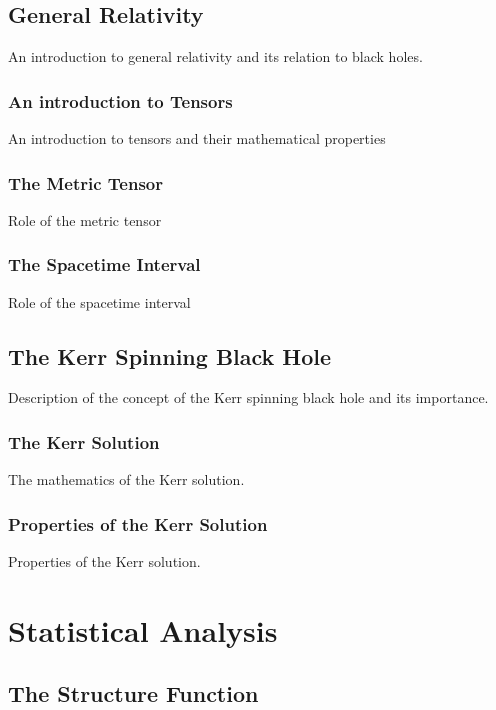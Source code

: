 \documentclass[12pt, oneside]{smuthesis}
\begin{document}
\section{\sc General Relativity}

An introduction to general relativity and its relation to black holes.

\subsection{\sc An introduction to Tensors}

An introduction to tensors and their mathematical properties

\subsection{\sc The Metric Tensor}

Role of the metric tensor

\subsection{\sc The Spacetime Interval}

Role of the spacetime interval

\section{\sc The Kerr Spinning Black Hole}

Description of the concept of the Kerr spinning black hole and its importance.

\subsection{\sc The Kerr Solution}

The mathematics of the Kerr solution.

\subsection{\sc Properties of the Kerr Solution}

Properties of the Kerr solution.

\chapter{\sc Statistical Analysis}

\section{\sc The Structure Function}
\end{document}
